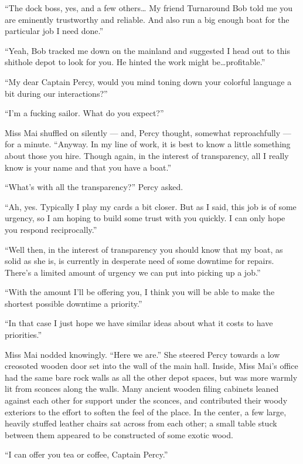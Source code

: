\documentclass[
]{scrbook}
\begin{document}
``The dock boss, yes, and a few others\ldots{} My friend Turnaround Bob
told me you are eminently trustworthy and reliable. And also run a big
enough boat for the particular job I need done.''

``Yeah, Bob tracked me down on the mainland and suggested I head out to
this shithole depot to look for you. He hinted the work might
be\ldots profitable.''

``My dear Captain Percy, would you mind toning down your colorful
language a bit during our interactions?''

``I'm a fucking sailor. What do you expect?''

Miss Mai shuffled on silently --- and, Percy thought, somewhat
reproachfully --- for a minute. ``Anyway. In my line of work, it is best
to know a little something about those you hire. Though again, in the
interest of transparency, all I really know is your name and that you
have a boat.''

``What's with all the transparency?'' Percy asked.

``Ah, yes. Typically I play my cards a bit closer. But as I said, this
job is of some urgency, so I am hoping to build some trust with you
quickly. I can only hope you respond reciprocally.''

``Well then, in the interest of transparency you should know that my
boat, as solid as she is, is currently in desperate need of some
downtime for repairs. There's a limited amount of urgency we can put
into picking up a job.''

``With the amount I'll be offering you, I think you will be able to make
the shortest possible downtime a priority.''

``In that case I just hope we have similar ideas about what it costs to
have priorities.''

Miss Mai nodded knowingly. ``Here we are.'' She steered Percy towards a
low creosoted wooden door set into the wall of the main hall. Inside,
Miss Mai's office had the same bare rock walls as all the other depot
spaces, but was more warmly lit from sconces along the walls. Many
ancient wooden filing cabinets leaned against each other for support
under the sconces, and contributed their woody exteriors to the effort
to soften the feel of the place. In the center, a few large, heavily
stuffed leather chairs sat across from each other; a small table stuck
between them appeared to be constructed of some exotic wood.

``I can offer you tea or coffee, Captain Percy.''
\end{document}
